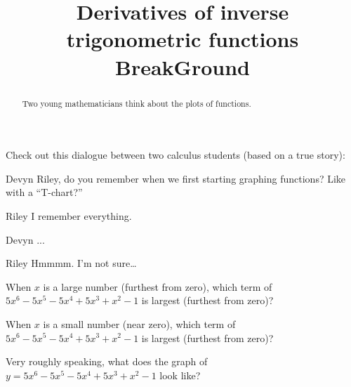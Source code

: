 \documentclass{ximera}
\title[Break-Ground:]{Derivatives of inverse trigonometric functions BreakGround}
\begin{document}
\begin{abstract}
  Two young mathematicians think about the plots of functions.
\end{abstract}
\maketitle

Check out this dialogue between two calculus students (based on a true
story):

\begin{dialogue}
\item[Devyn] Riley, do you remember when we first starting graphing
  functions? Like with a ``T-chart?''
\item[Riley] I remember everything.
\item[Devyn] ...
\item[Riley] Hmmmm. I'm not sure\dots
\end{dialogue}

\begin{problem}
  When $x$ is a large number (furthest from zero), which term of
  $5x^6-5x^5-5x^4+5x^3+x^2 -1$ is largest (furthest from zero)?
  \begin{multipleChoice}
  \end{multipleChoice}
\end{problem}

\begin{problem}
  When $x$ is a small number (near zero), which term of
  $5x^6-5x^5-5x^4+5x^3+x^2 -1$ is largest (furthest from zero)?
  \begin{multipleChoice}
  \end{multipleChoice}
\end{problem}


\begin{problem}
  Very roughly speaking, what does the graph of
  $y=5x^6-5x^5-5x^4+5x^3+x^2 -1$ look like?
  \begin{multipleChoice}
  \end{multipleChoice}
\end{problem}



%
\end{document}
